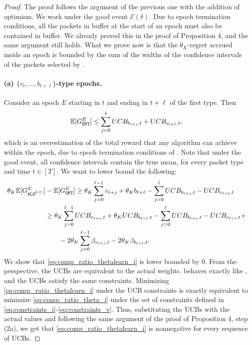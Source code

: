 \begin{proof}
    The proof follows the argument of the previous one with the addition of optimism. We work under the good event $\mathcal{E}(\delta)$. Due to \algthetalearn epoch termination conditions, all the packets in \opt buffer at the start of an epoch must also be contained in \algthetalearn buffer. We already proved this in the proof of Proposition 4, and the same argument still holds. What we prove now is that the $\theta_K$-regret accrued inside an epoch is bounded by the sum of the widths of the confidence intervals of the packets selected by \algthetalearn.
    \paragraph{(a) $\{v_t, \ldots, b_{t+\ell}\}$-type epochs.} Consider an epoch $E$ starting in $t$ and ending in $t+\ell$ of the first type.  
    Then
    \begin{align*}
        \mathbb{E}[\Gopt^E] \le \sum_{j=0}^{\ell} UCB_{b_{t+j},t} + UCB_{v_{t+\ell},t},
    \end{align*}
    which is an overestimation of the total reward that any algorithm can achieve within the epoch, due to epoch termination conditions of \algthetalearn. Note that under the good event, all confidence intervals contain the true mean, for every packet type and time $t\in [T]$. We want to lower bound the following:
    \begin{align}
        \theta_K\mathbb{E}[\Galgthetalearn^E]&-\mathbb{E}[\Gopt^E] \ge \theta_K\sum_{j=0}^{\ell-1}v_{t+j} + \theta_K b_{t+\ell} - \sum_{j=0}^\ell UCB_{b_{t+j},t} - UCB_{v_{t+\ell},t} \notag \\
        &\ge \theta_K\sum_{j=0}^{\ell-1}UCB_{v_{t+j},t} + \theta_K UCB_{b_{t+\ell},t} - \sum_{j=0}^\ell UCB_{b_{t+j},t} - UCB_{v_{t+\ell},t}+ \label{eq:comp_ratio_thetalearn_i}\\
        &\qquad- 2\theta_K \sum_{j=0}^{\ell-1}\beta_{v_{t+j},t} - 2\theta_K\beta_{b_{t+\ell},t}.\notag
    \end{align}
    We show that \eqref{eq:comp_ratio_thetalearn_i} is lower bounded by $0$. From the \algthetalearn perspective, the UCBs are equivalent to the actual weights. \algthetalearn behaves exactly like \algtheta, and the UCBs satisfy the same constraints. Minimizing \eqref{eq:comp_ratio_thetalearn_i} under the UCB constraints is exactly equivalent to minimize \eqref{eq:comp_ratio_theta_i} under the set of constraints defined in \eqref{eq:constraints_i}-\eqref{eq:constraints_v}. Thus, substituting the UCBs with the actual values and following the same argument of the proof of Proposition 4, step (2a), we get that \eqref{eq:comp_ratio_thetalearn_i} is nonnegative for every sequence of UCBs. 


\end{proof}
